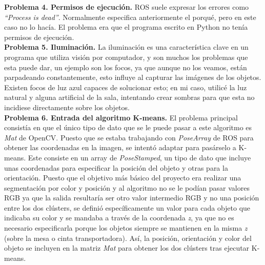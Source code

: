 
\noindent \textbf{Problema 4. Permisos de ejecución.} ROS suele expresar los errores como \textit{``Process is dead''}. Normalmente especifica anteriormente el porqué, pero en este caso no lo hacía. El problema era que el programa escrito en Python no tenía permisos de ejecución. \\


\noindent \textbf{Problema 5. Iluminación.} La iluminación es una característica clave en un programa que utiliza visión por computador, y son muchos los problemas que esta puede dar, un ejemplo son los focos, ya que aunque no los veamos, están parpadeando constantemente, esto influye al capturar las imágenes de los objetos. Existen focos de luz azul capaces de solucionar esto; en mi caso, utilicé la luz natural y alguna artificial de la sala, intentando crear sombras para que esta no incidiese directamente sobre los objetos.\\

\noindent \textbf{Problema 6. Entrada del algoritmo K-means.} El problema principal consistía en que el único tipo de dato que se le puede pasar a este algoritmo es \textit{Mat} de OpenCV. Puesto que se estaba trabajando con \textit{PoseArray} de ROS para obtener las coordenadas en la imagen, se intentó adaptar para pasárselo a K-means. Este consiste en un array de \textit{PoseStamped}, un tipo de dato que incluye unas coordenadas para especificar la posición del objeto y otras para la orientación. Puesto que el objetivo más básico del proyecto era realizar una segmentación por color y posición y al algoritmo no se le podían pasar valores RGB ya que la salida resultaría ser otro valor intermedio RGB y no una posición entre los dos clústers, se definió específicamente un valor para cada objeto que indicaba su color y se mandaba a través de la coordenada \textit{z}, ya que no es necesario especificarla porque los objetos siempre se mantienen en la misma \textit{z} (sobre la mesa o cinta transportadora). Así, la posición, orientación y color del objeto se incluyen en la matriz \textit{Mat} para obtener los dos clústers tras ejecutar K-means.\\